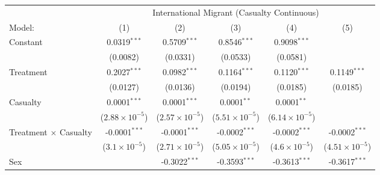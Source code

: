 \begingroup
\centering
\renewcommand{\arraystretch}{0.75}   %
\setlength{\aboverulesep}{0pt}       %
\setlength{\belowrulesep}{0pt} 
\begin{tabular}{lccccc}
   \tabularnewline \midrule \midrule
    & \multicolumn{5}{c}{International Migrant (Casualty Continuous)}\\
                                                
   Model:                                      & (1)                     & (2)                            & (3)                     & (4)                     & (5)\\  
   \midrule
   
   Constant                                    & 0.0319$^{***}$          & 0.5709$^{***}$                 & 0.8546$^{***}$          & 0.9098$^{***}$          &   \\   
                                               & (0.0082)                & (0.0331)                       & (0.0533)                & (0.0581)                &   \\   
   Treatment                                   & 0.2027$^{***}$          & 0.0982$^{***}$                 & 0.1164$^{***}$          & 0.1120$^{***}$          & 0.1149$^{***}$\\   
                                               & (0.0127)                & (0.0136)                       & (0.0194)                & (0.0185)                & (0.0185)\\   
   Casualty                               & 0.0001$^{***}$          & 0.0001$^{***}$                 & 0.0001$^{**}$           & 0.0001$^{**}$           &   \\   
                                               & ($2.88\times 10^{-5}$)  & ($2.57\times 10^{-5}$)         & ($5.51\times 10^{-5}$)  & ($6.14\times 10^{-5}$)  &   \\   
   Treatment $\times$ Casualty            & -0.0001$^{***}$         & -0.0001$^{***}$                & -0.0002$^{***}$         & -0.0002$^{***}$         & -0.0002$^{***}$\\   
                                               & ($3.1\times 10^{-5}$)   & ($2.71\times 10^{-5}$)         & ($5.05\times 10^{-5}$)  & ($4.6\times 10^{-5}$)   & ($4.51\times 10^{-5}$)\\    
   Sex                                         &                         & -0.3022$^{***}$                & -0.3593$^{***}$         & -0.3613$^{***}$         & -0.3617$^{***}$\\   

\end{tabular}

